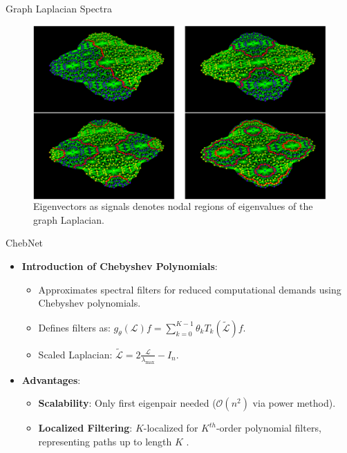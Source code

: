 \begin{frame}{Graph Laplacian Spectra}
    \begin{figure}
      \begin{columns}
        \caption{Eigenvectors as signals denotes nodal regions of eigenvalues of the graph Laplacian.}
        \label{fig:graph_spectra}
        \includegraphics[width=\textwidth]{img/graph_spectra.png}
      \end{columns}
    \end{figure}

\end{frame}


\begin{frame}{ChebNet}
    \begin{itemize}
        \item \textbf{Introduction of Chebyshev Polynomials}:
        \begin{itemize}
            \item Approximates spectral filters for reduced computational demands using Chebyshev polynomials.
            \item Defines filters as: $ g_{\theta}(\mathcal{L} ) f = \sum_{k=0}^{K-1} \theta_k T_k(\widetilde{\mathcal{L}}) f $.
            \item Scaled Laplacian: $\widetilde{\mathcal{L}} = 2 \frac{\mathcal{L}}{\lambda_\text{max}} - I_n$.
        \end{itemize}
        \item \textbf{Advantages}:
        \begin{itemize}
            \item \textbf{Scalability}: Only first eigenpair needed ($\mathcal{O}(n^2)$ via power method).
            \item \textbf{Localized Filtering}: $K$-localized for $K^{th}$-order polynomial filters, representing paths up to length $K$ \cite{defferrard2016convolutional}.
        \end{itemize}
    \end{itemize}
\end{frame}

